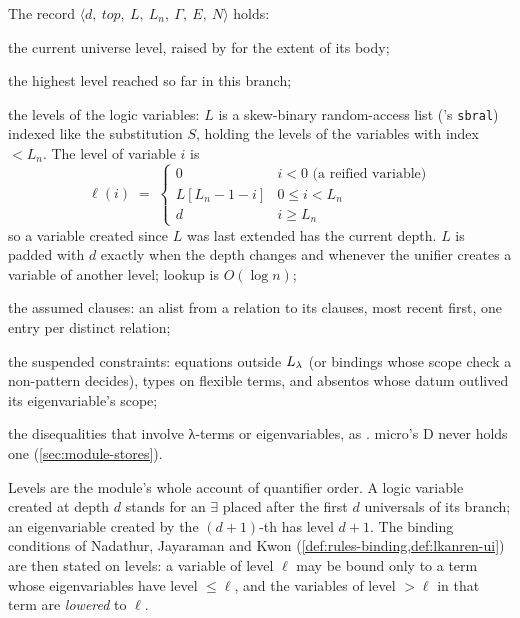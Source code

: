 \begin{definition}\label{def:module-state}
The record $\langle d,\ \mathit{top},\ L,\ L_n,\ \Gamma,\ E,\ N\rangle$ holds:
\begin{description}[style=nextline,leftmargin=2.2em]
  \item[$d$ (\texttt{depth})] the current universe level, raised by  for the extent of its body;
  \item[$\mathit{top}$] the highest level reached so far in this branch;
  \item[$L,\,L_n$] the levels of the logic variables: $L$ is a skew-binary random-access list (\aux's
    \texttt{sbral}) indexed like the substitution $S$, holding the levels of the variables with index
    $<L_n$. The level of variable $i$ is
    \[
      \ell(i) \;=\; \begin{cases} 0 & i<0 \text{ (a reified variable)}\\
                                   L[L_n-1-i] & 0\le i<L_n\\
                                   d & i \ge L_n \end{cases}
    \]
    so a variable created since $L$ was last extended has the current depth. $L$ is padded with $d$ exactly
    when the depth changes and whenever the unifier creates a variable of another level; lookup is
    $O(\log n)$;
  \item[$\Gamma$] the assumed clauses: an alist from a relation to its clauses, most recent first, one entry
    per distinct relation;
  \item[$E$] the suspended constraints: equations  outside $L_\lambda$ (or bindings whose scope check
    a non-pattern decides), types  on flexible terms, and absentos  whose
    datum outlived its eigenvariable's scope;
  \item[$N$] the disequalities that involve λ-terms or eigenvariables, as . micro's D never
    holds one (\cref{sec:module-stores}).
\end{description}
\end{definition}

Levels are the module's whole account of quantifier order. A logic variable created at depth $d$ stands for
an $\exists$ placed after the first $d$ universals of its branch; an eigenvariable created by the $(d{+}1)$-th
 has level $d+1$. The binding conditions of Nadathur, Jayaraman and Kwon \cite{NadathurJayaramanKwon1995}
(\cref{def:rules-binding,def:lkanren-ui}) are then stated on levels: a variable of level $\ell$ may be bound
only to a term whose eigenvariables have level $\le\ell$, and the variables of level $>\ell$ in that term are
\emph{lowered} to $\ell$.

